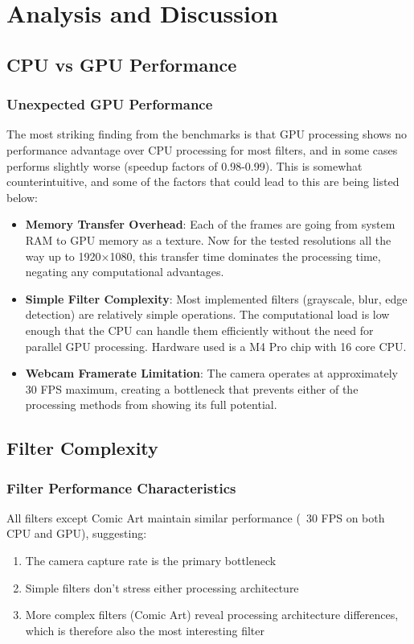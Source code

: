 \documentclass[12pt,a4paper]{article}
\begin{document}
\section{Analysis and Discussion}

\subsection{CPU vs GPU Performance}
\subsubsection{Unexpected GPU Performance}
The most striking finding from the benchmarks is that GPU processing shows no performance advantage over CPU processing for most filters, and in some cases performs slightly worse (speedup factors of 0.98-0.99). This is somewhat counterintuitive, and some of the factors that could lead to this are being listed below:
\begin{itemize}
    \item \textbf{Memory Transfer Overhead}: Each of the frames are going from system RAM to GPU memory as a texture. Now for the tested resolutions all the way up to 1920×1080, this transfer time dominates the processing time, negating any computational advantages.
    \item \textbf{Simple Filter Complexity}: Most implemented filters (grayscale, blur, edge detection) are relatively simple operations. The computational load is low enough that the CPU can handle them efficiently without the need for parallel GPU processing. Hardware used is a M4 Pro chip with 16 core CPU.
    \item \textbf{Webcam Framerate Limitation}: The camera operates at approximately 30 FPS maximum, creating a bottleneck that prevents either of the processing methods from showing its full potential.
\end{itemize}

\subsection{Filter Complexity}
\subsubsection{Filter Performance Characteristics}
All filters except Comic Art maintain similar performance (~30 FPS on both CPU and GPU), suggesting:
\begin{enumerate}
    \item The camera capture rate is the primary bottleneck
    \item Simple filters don't stress either processing architecture
    \item More complex filters (Comic Art) reveal processing architecture differences, which is therefore also the most interesting filter
\end{enumerate}
\end{document}

